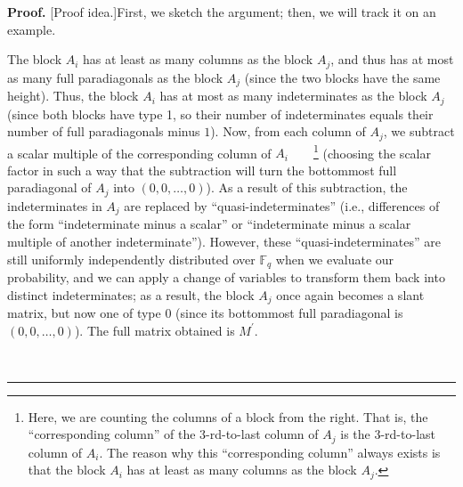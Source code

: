 \documentclass[numbers=enddot,12pt,final,onecolumn,notitlepage]{scrartcl}%
\theoremstyle{definition}
\newenvironment{proof}[1][Proof]{\noindent\textbf{#1.} }{\ \rule{0.5em}{0.5em}}
\newcommand{\Fq}{\mathbb{F}_q}
\theoremstyle{plainsl}
\begin{document}
\begin{proof}
[Proof idea.]First, we sketch the argument; then, we will track it on an example.

The block $A_{i}$ has at least as many columns as the block $A_{j}$, and thus
has at most as many full paradiagonals as the block $A_{j}$ (since the two
blocks have the same height). Thus, the block $A_{i}$ has at most as many
indeterminates as the block $A_{j}$ (since both blocks have type 1, so their
number of indeterminates equals their number of full paradiagonals minus $1$).
Now, from each column of $A_{j}$, we subtract a scalar multiple of the
corresponding column of $A_{i}$\ \ \ \ \footnote{Here, we are counting the
columns of a block from the right. That is, the ``corresponding column''
of the $3$-rd-to-last column of
$A_{j}$ is the $3$-rd-to-last column of $A_{i}$. The reason why this
``corresponding column'' always exists is
that the block $A_{i}$ has at least as many columns as the block $A_{j}$.}
(choosing the scalar factor in such a way that the subtraction will turn the
bottommost full paradiagonal of $A_{j}$ into $\left(  0,0,\ldots,0\right)  $).
As a result of this subtraction, the indeterminates in $A_{j}$ are replaced by
``quasi-indeterminates'' (i.e., differences
of the form ``indeterminate minus a scalar'' or
``indeterminate minus a scalar multiple of another
indeterminate''). However, these ``quasi-indeterminates'' are still uniformly
independently
distributed over $\Fq$ when we evaluate our probability, and we can apply a
change of variables to transform them back into distinct indeterminates; as a
result, the block $A_{j}$ once again becomes a slant matrix, but now one of
type 0 (since its bottommost full paradiagonal is $\left(  0,0,\ldots
,0\right)  $). The full matrix obtained is $M^{\prime}$.


\end{proof}
\end{document}
